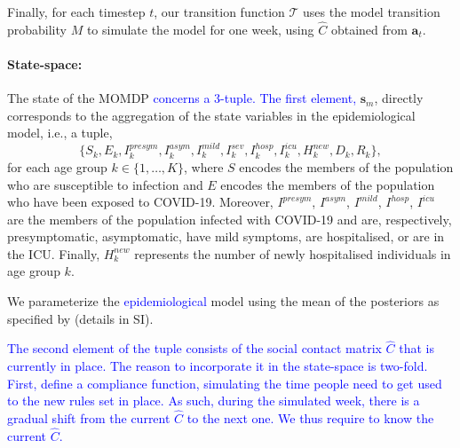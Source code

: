\documentclass{article}
\newcommand\added[1]{\textcolor{blue}{#1}}
\newcommand{\mdptransition}{\mathcal{T}}
\newcommand{\mdpstate}{\mathbf{s}}
\newcommand{\mdpaction}{\mathbf{a}}
\newcommand{\momdpname}{MOBelCov}
\newcommand{\agegroups}{K}
\begin{document}
Finally, for each timestep $t$, our transition function $\mdptransition$ uses the model transition probability $M$ to simulate the model for one week, using $\hat{C}$ obtained from $\mdpaction_t$.


\paragraph{State-space:} The state of the MOMDP \added{concerns a 3-tuple. The first element,} $\mdpstate_m$, directly corresponds to the aggregation of the state variables in the epidemiological model, i.e., a tuple,
\begin{equation}
    \{S_k, E_k, I_k^{presym}, I_k^{asym}, I_k^{mild}, I_k^{sev}, I_k^{hosp}, I_k^{icu}, H^{new}_k, D_k, R_k\},
\end{equation}
%
for each age group $k \in \{1, \ldots, \agegroups\}$, where $S$ encodes the members of the population who are susceptible to infection and $E$ encodes the members of the population who have been exposed to COVID-19. Moreover, $I^{presym}$, $I^{asym}$, $I^{mild}$, $I^{hosp}$, $I^{icu}$ are the members of the population infected with COVID-19 and are, respectively, presymptomatic, asymptomatic, have mild symptoms, are hospitalised, or are in the ICU. Finally, $H^{new}_k$ represents the number of newly hospitalised individuals in age group $k$.

We parameterize the \added{epidemiological} model using the mean of the posteriors as specified by \citet{abrams2021modelling} (details in SI).

\added{The second element of the tuple consists of the social contact matrix $\hat{C}$ that is currently in place. The reason to incorporate it in the state-space is two-fold. First, \citet{abrams2021modelling} define a compliance function, simulating the time people need to get used to the new rules set in place. As such, during the simulated week, there is a gradual shift from the current $\hat{C}$ to the next one. We thus require to know the current $\hat{C}$.}
\end{document}
